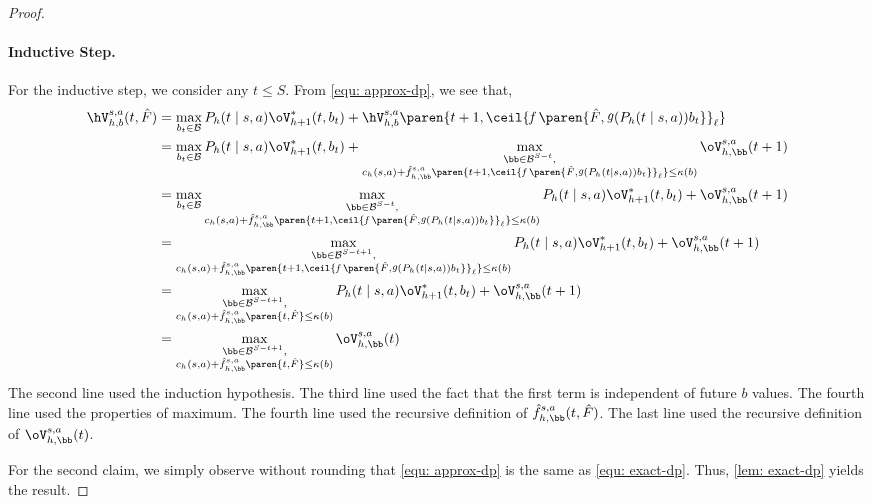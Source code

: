 \documentclass[pdftex, a4paper, 12pt]{article}
\newcommand{\round}[2]{\ceil{#2}_{#1}}
\newcommand{\mB}{\mathcal{B}}
\newcommand{\hf}{\hat{f}}
\newcommand{\hF}{\hat{F}}
\DeclareMathOperator*{\f}{\mathit{f}}
\DeclareMathOperator*{\g}{\mathit{g}}
\begin{document}
\begin{proof}
    \paragraph{Inductive Step.}  For the inductive step, we consider any $t \leq S$. From \eqref{equ: approx-dp}, we see that,
    \begin{align*}
        \hV_{h,b}^{s,a}(t,\hF) &= \max_{b_t \in \mB} P_h(t \mid s,a)\oV^*_{h+1}(t,b_t) + \hV_{h,b}^{s,a}\paren{t+1, \round{\ell}{\f\paren{\hF, \g(P_h(t \mid s,a))b_t}}} \\
        &= \max_{b_t \in \mB} P_h(t \mid s,a)\oV^*_{h+1}(t,b_t) + \max_{\substack{\bb \in \mB^{S-t}, \\ c_h(s,a) + \hat{f}_{h,\bb}^{s,a}\paren{t+1, \round{\ell}{\f\paren{\hF, \g(P_h(t \mid s,a))b_t}}} \leq \kappa(b)}}\oV_{h, \bb}^{s,a}(t+1)\\
        &= \max_{b_t \in \mB}\max_{\substack{\bb \in \mB^{S-t}, \\ c_h(s,a) + \hat{f}_{h,\bb}^{s,a}\paren{t+1, \round{\ell}{\f\paren{\hF, \g(P_h(t \mid s,a))b_t}}} \leq \kappa(b)}} P_h(t \mid s,a)\oV^*_{h+1}(t,b_t) + \oV_{h, \bb}^{s,a}(t+1) \\
        &=\max_{\substack{\bb \in \mB^{S-t+1}, \\ c_h(s,a) + \hat{f}_{h,\bb}^{s,a}\paren{t+1, \round{\ell}{\f\paren{\hF, \g(P_h(t \mid s,a))b_t}}} \leq \kappa(b)}} P_h(t \mid s,a)\oV^*_{h+1}(t,b_t) + \oV_{h, \bb}^{s,a}(t+1) \\
        &=\max_{\substack{\bb \in \mB^{S-t+1}, \\ c_h(s,a) + \hat{f}_{h,\bb}^{s,a}\paren{t, \hF} \leq \kappa(b)}} P_h(t \mid s,a)\oV^*_{h+1}(t,b_t) + \oV_{h, \bb}^{s,a}(t+1) \\
        &= \max_{\substack{\bb \in \mB^{S-t+1}, \\ c_h(s,a) + \hat{f}_{h,\bb}^{s,a}\paren{t, \hF} \leq \kappa(b)}} \oV_{h, \bb}^{s,a}(t)
    \end{align*}
    The second line used the induction hypothesis. The third line used the fact that the first term is independent of future $b$ values. The fourth line used the properties of maximum. The fourth line used the recursive definition of $\hf_{h,\bb}^{s,a}(t, \hF)$. The last line used the recursive definition of $\oV_{h,\bb}^{s,a}(t)$. 

    For the second claim, we simply observe without rounding that \eqref{equ: approx-dp} is the same as \eqref{equ: exact-dp}. Thus, \cref{lem: exact-dp} yields the result.
\end{proof}
\end{document}

